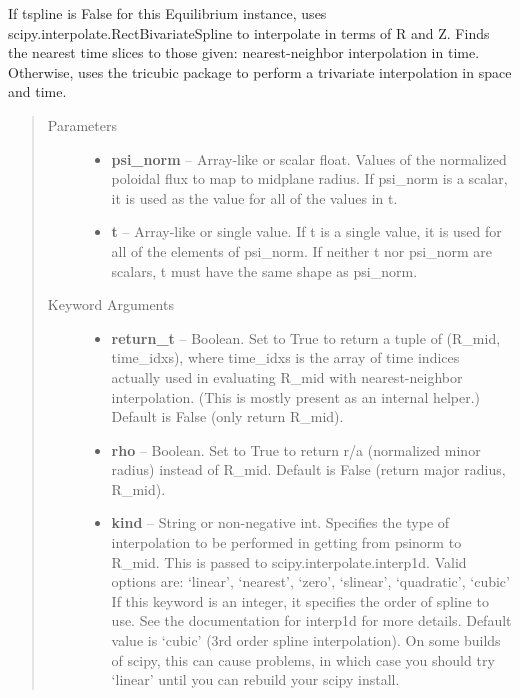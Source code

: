 \documentclass[letterpaper,10pt,english]{sphinxmanual}
\begin{document}
\begin{fulllineitems}
\begin{fulllineitems}
If tspline is False for this Equilibrium instance, uses
scipy.interpolate.RectBivariateSpline to interpolate in terms of R and
Z. Finds the nearest time slices to those given: nearest-neighbor
interpolation in time. Otherwise, uses the tricubic package to perform
a trivariate interpolation in space and time.
\begin{quote}\begin{description}
\item[{Parameters }] \leavevmode\begin{itemize}
\item {} 
\textbf{psi\_norm} --
Array-like or scalar float. Values of the normalized
poloidal flux to map to midplane radius. If psi\_norm is a scalar,
it is used as the value for all of the values in t.

\item {} 
\textbf{t} --
Array-like or single value. If t is a single value, it is used
for all of the elements of psi\_norm. If neither t nor psi\_norm
are scalars, t must have the same shape as psi\_norm.

\end{itemize}

\item[{Keyword Arguments}] \leavevmode\begin{itemize}
\item {} 
\textbf{return\_t} --
Boolean. Set to True to return a tuple of (R\_mid,
time\_idxs), where time\_idxs is the array of time indices
actually used in evaluating R\_mid with nearest-neighbor
interpolation. (This is mostly present as an internal helper.)
Default is False (only return R\_mid).

\item {} 
\textbf{rho} --
Boolean. Set to True to return r/a (normalized minor radius)
instead of R\_mid. Default is False (return major radius, R\_mid).

\item {} 
\textbf{kind} --
String or non-negative int. Specifies the type of interpolation
to be performed in getting from psinorm to R\_mid. This is
passed to scipy.interpolate.interp1d. Valid options are:
`linear', `nearest', `zero', `slinear', `quadratic', `cubic'
If this keyword is an integer, it specifies the order of spline
to use. See the documentation for interp1d for more details.
Default value is `cubic' (3rd order spline interpolation). On
some builds of scipy, this can cause problems, in which case
you should try `linear' until you can rebuild your scipy install.


\end{itemize}
\end{description}
\end{quote}
\end{fulllineitems}
\end{fulllineitems}
\end{document}
